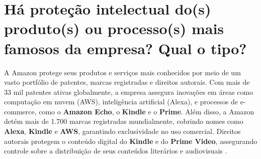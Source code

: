 \newpage
\section{Há proteção intelectual do(s) produto(s) ou processo(s) mais famosos da empresa? Qual o tipo?}
A Amazon protege seus produtos e serviços mais conhecidos por meio de um vasto portfólio de patentes, marcas registradas e direitos autorais. Com mais de 33 mil patentes ativas globalmente, a empresa assegura inovações em áreas como computação em nuvem (AWS), inteligência artificial (Alexa), e processos de e-commerce, como o \textbf{Amazon Echo}, o \textbf{Kindle} e o \textbf{Prime}. Além disso, a Amazon detém mais de 1.700 marcas registradas mundialmente, cobrindo nomes como \textbf{Alexa}, \textbf{Kindle} e \textbf{AWS}, garantindo exclusividade no uso comercial. Direitos autorais protegem o conteúdo digital do \textbf{Kindle} e do \textbf{Prime Video}, assegurando controle sobre a distribuição de seus conteúdos literários e audiovisuais \cite{amazonPatents2024}.